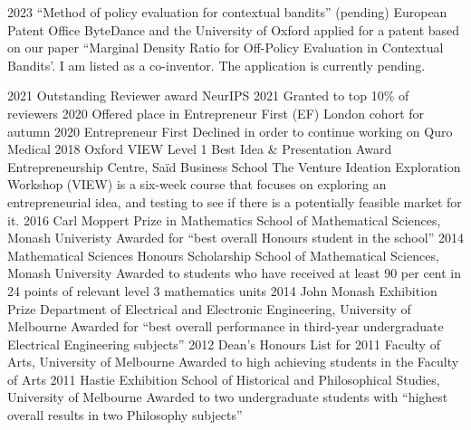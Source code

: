 \documentclass[9pt]{developercv} %
\begin{document}
\newpage
{}
\begin{entrylist}
  \entry
    {2023}
    {``Method of policy evaluation for contextual bandits'' (pending)}
    {European Patent Office}
    {ByteDance and the University of Oxford applied for a patent based on our paper ``Marginal Density Ratio for Off-Policy Evaluation in Contextual Bandits'. I am listed as a co-inventor. The application is currently pending.}
\end{entrylist}
 
\begin{entrylist}
  \entry
    {2021}
    {Outstanding Reviewer award}
    {NeurIPS 2021}
    {Granted to top 10\% of reviewers}
  \entry
    {2020}
    {Offered place in Entrepreneur First (EF) London cohort for autumn 2020}
    {Entrepreneur First}
    {Declined in order to continue working on Quro Medical}
  \entry
    {2018}
    {Oxford VIEW Level 1 Best Idea \& Presentation Award}
    {Entrepreneurship Centre, Sa\"id Business School}
    {The Venture Ideation Exploration Workshop (VIEW) is a six-week course that focuses on exploring an entrepreneurial idea, and testing to see if there is a potentially feasible market for it.}
  \entry
    {2016}
    {Carl Moppert Prize in Mathematics}
    {School of Mathematical Sciences, Monash Univeristy}
    {Awarded for ``best overall Honours student in the school''}
  \entry
    {2014}
    {Mathematical Sciences Honours Scholarship}
    {School of Mathematical Sciences, Monash University}
    {Awarded to students who have received at least 90 per cent in 24 points of relevant level 3 mathematics units}
  \entry
    {2014}
    {John Monash Exhibition Prize}
    {Department of Electrical and Electronic Engineering, University of Melbourne}
    {Awarded for ``best overall performance in third-year undergraduate Electrical Engineering subjects''}
  \entry
    {2012}
    {Dean's Honours List for 2011}
    {Faculty of Arts, University of Melbourne}
    {Awarded to high achieving students in the Faculty of Arts}
  \entry
    {2011}
    {Hastie Exhibition}
    {School of Historical and Philosophical Studies, University of Melbourne}
    {Awarded to two undergraduate students with ``highest overall results in two Philosophy subjects''}
\end{entrylist}
\end{document}
